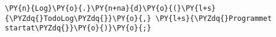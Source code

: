\begin{Verbatim}[commandchars=\\\{\}]
\PY{n}{Log}\PY{o}{.}\PY{n+na}{d}\PY{o}{(}\PY{l+s}{\PYZdq{}TodoLog\PYZdq{}}\PY{o}{,} \PY{l+s}{\PYZdq{}Programmet startat\PYZdq{}}\PY{o}{)}\PY{o}{;}
\end{Verbatim}
